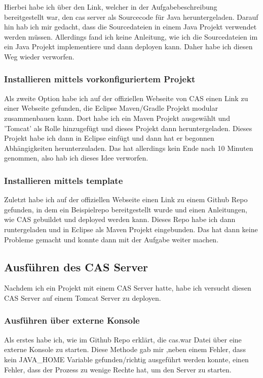 Hierbei habe ich über den Link, welcher in der Aufgabebeschreibung bereitgestellt war, den cas server als Sourcecode für Java heruntergeladen. Darauf hin hab ich mir gedacht, dass die Sourcedateien in einem Java Projekt verwendet werden müssen. Allerdings fand ich keine Anleitung, wie ich die Sourcedateien im ein Java Projekt implementiere und dann deployen kann. Daher habe ich diesen Weg wieder verworfen.

\subsubsection{Installieren mittels vorkonfiguriertem Projekt}

Als zweite Option habe ich auf der offiziellen Webseite von CAS einen Link zu einer Webseite gefunden, die Eclipse Maven/Gradle Projekt modular zusammenbauen kann. Dort habe ich ein Maven Projekt ausgewählt und 'Tomcat' als Rolle hinzugefügt und dieses Projekt dann heruntergeladen. Dieses Projekt habe ich dann in Eclipse einfügt und dann hat er begonnen Abhängigkeiten herunterzuladen. Das hat allerdings kein Ende nach 10 Minuten genommen, also hab ich dieses Idee verworfen.

\subsubsection{Installieren mittels template}

Zuletzt habe ich auf der offiziellen Webseite einen Link zu einem Github Repo gefunden, in dem ein Beispielrepo bereitgestellt wurde und einen Anleitungen, wie CAS gebuildet und deployed werden kann. Dieses Repo habe ich dann runtergeladen und in Eclipse als Maven Projekt eingebunden. Das hat dann keine Probleme gemacht und konnte dann mit der Aufgabe weiter machen.

\subsection{Ausführen des CAS Server}

Nachdem ich ein Projekt mit einem CAS Server hatte, habe ich versucht diesen CAS Server auf einem Tomcat Server zu deployen.

\subsubsection{Ausführen über externe Konsole}

Als erstes habe ich, wie im Github Repo erklärt, die cas.war Datei über eine externe Konsole zu starten. Diese Methode gab mir ,neben einem Fehler, dass kein JAVA\_HOME Variable gefunden/richtig ausgeführt werden konnte, einen Fehler, dass der Prozess zu wenige Rechte hat, um den Server zu starten.

